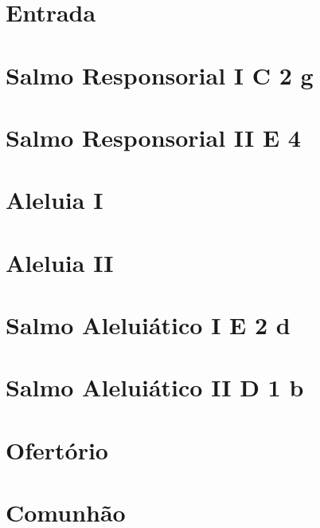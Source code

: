 \documentclass[a4paper]{memoir}
\title{\mytitle}
\author{}
\date{}
\begin{document}
\maketitle

\begin{multicols}{2}
    \section{Entrada}

    \section[Salmo Responsorial I]{Salmo Responsorial I \textmd{C 2 g}}\label{subsection:tempus-per-annum/missa-6/psalmus-responsorius-1}

    \section[Salmo Responsorial II]{Salmo Responsorial II \textmd{E 4}}\label{subsection:tempus-per-annum/missa-6/psalmus-responsorius-2}

    \section{Aleluia I}\label{subsection:tempus-per-annum/missa-6/alleluia-1}

    \section{Aleluia II}\label{subsection:tempus-per-annum/missa-6/alleluia-2}

    \section[Salmo Aleluiático I]{Salmo Aleluiático I \textmd{E 2 d}}\label{subsection:tempus-per-annum/missa-6/psalmus-alleluiaticus-1}

    \section[Salmo Aleluiático II]{Salmo Aleluiático II \textmd{D 1 b}}\label{subsection:tempus-per-annum/missa-6/psalmus-alleluiaticus-2}

    \section{Ofertório}

    \section{Comunhão}
\end{multicols}
\end{document}
